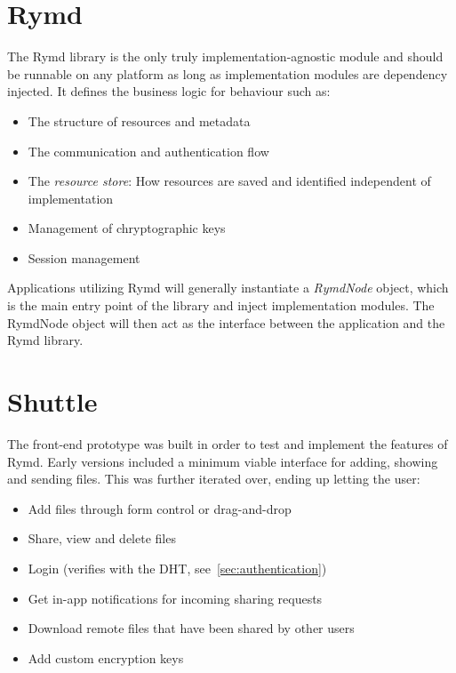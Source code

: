 \section{Rymd}
\label{sec:rymd}

The Rymd library is the only truly implementation-agnostic module and should be runnable on any platform as long as implementation modules are dependency injected. It defines the business logic for behaviour such as:

\begin{itemize}
  \item The structure of resources and metadata
  \item The communication and authentication flow
  \item The \emph{resource store}: How resources are saved and identified independent of implementation
  \item Management of chryptographic keys
  \item Session management
\end{itemize}

Applications utilizing Rymd will generally instantiate a \emph{RymdNode} object, which is the main entry point of the library and inject implementation modules. The RymdNode object will then act as the interface between the application and the Rymd library.

\section{Shuttle}
\label{sec:shuttle}
The front-end prototype was built in order to test and implement the features of Rymd. Early versions included a minimum viable interface for adding, showing and sending files. This was further iterated over, ending up letting the user:

\begin{itemize}
  \item Add files through form control or drag-and-drop
  \item Share, view and delete files
  \item Login (verifies with the DHT, see~\ref{sec:authentication})
  \item Get in-app notifications for incoming sharing requests
  \item Download remote files that have been shared by other users
  \item Add custom encryption keys
\end{itemize}

